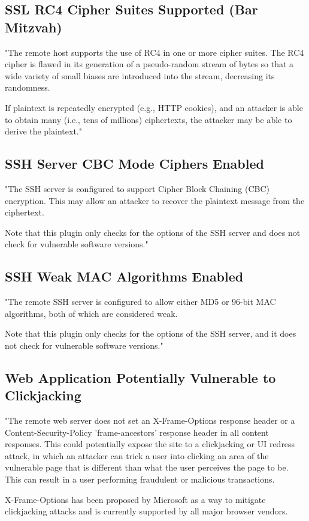 \documentclass[
	12pt,				%
	openright,			%
	twoside,			%
	a4paper,			%
	english,			%
	french,				%
	spanish,			%
	brazil				%
	]{abntex2}
\begin{document}
\subsection{SSL RC4 Cipher Suites Supported (Bar Mitzvah)}
"The remote host supports the use of RC4 in one or more cipher suites.
The RC4 cipher is flawed in its generation of a pseudo-random stream
of bytes so that a wide variety of small biases are introduced into
the stream, decreasing its randomness.

If plaintext is repeatedly encrypted (e.g., HTTP cookies), and an
attacker is able to obtain many (i.e., tens of millions) ciphertexts,
the attacker may be able to derive the plaintext."

\subsection{SSH Server CBC Mode Ciphers Enabled}
"The SSH server is configured to support Cipher Block Chaining (CBC)
encryption.  This may allow an attacker to recover the plaintext message
from the ciphertext. 

Note that this plugin only checks for the options of the SSH server and
does not check for vulnerable software versions."

\subsection{SSH Weak MAC Algorithms Enabled}
"The remote SSH server is configured to allow either MD5 or 96-bit MAC
algorithms, both of which are considered weak.

Note that this plugin only checks for the options of the SSH server,
and it does not check for vulnerable software versions."

\subsection{Web Application Potentially Vulnerable to Clickjacking}
"The remote web server does not set an X-Frame-Options response header
or a Content-Security-Policy 'frame-ancestors' response header in all
content responses. This could potentially expose the site to a
clickjacking or UI redress attack, in which an attacker can trick a
user into clicking an area of the vulnerable page that is different
than what the user perceives the page to be. This can result in a user
performing fraudulent or malicious transactions.

X-Frame-Options has been proposed by Microsoft as a way to mitigate
clickjacking attacks and is currently supported by all major browser
vendors.
\end{document}
